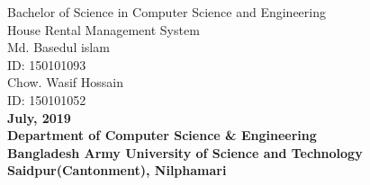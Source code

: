 \documentclass[12pt,a4paper]{article}
\begin{document}
\begin{titlepage}
	\center
	{\fontsize{16}{10}\selectfont Bachelor of Science in Computer Science and Engineering}\\
	\vspace{1.5in}
	{\fontsize{14}{10}\selectfont House Rental Management System}\\
	\vspace{1.5in}
	{\fontsize{14}{16}\selectfont 
	Md. Basedul islam\\ID: 150101093\\Chow. Wasif Hossain\\ID: 150101052}\\
	\vspace{1.5in}
	{\fontsize{12}{10}\selectfont \textbf{July, 2019}}\\
	\vspace{.5em}
	{\fontsize{16}{10}\selectfont \textbf{Department of Computer Science \& Engineering}}\\
	\vspace{.5em}
	{\fontsize{14}{10}\selectfont \textbf{Bangladesh Army University of Science and Technology}}\\
	\vspace{.5em}
	{\fontsize{12}{10}\selectfont \textbf{Saidpur(Cantonment), Nilphamari}}
	
\end{titlepage}

\begin{titlepage}
	
\end{titlepage}
\end{document}
